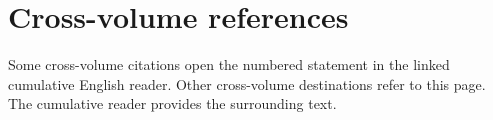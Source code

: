 \clearpage
{}
\section*{Cross-volume references}

Some cross-volume citations open the numbered statement in the linked
cumulative English reader. Other cross-volume destinations refer to this
page. The cumulative reader provides the surrounding text.

\label{0.2.1.8}
\label{0.2.2.2}
\label{0.6.3.4}
\label{0.7.3.5}
\label{0.9.2.5}

\makeatletter
\newcommand{\EGAIVThreeRegisterExternalTargets}[1]{%
  \@for\EGAIVThreeExternalTarget:=#1\do{%
    \edef\EGAIVThreeResolvedTarget{\EGAIVThreeExternalTarget}%
    \expandafter\sgaStableTarget\expandafter{\EGAIVThreeResolvedTarget}%
  }%
}
\makeatother


